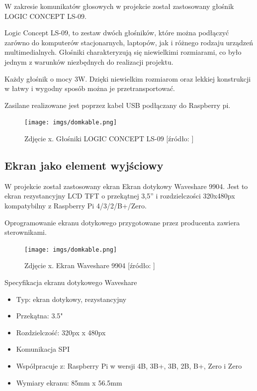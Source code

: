 \documentclass[a4paper,12pt,reqno]{article}
\begin{document}
W zakresie komunikatów głosowych w projekcie został zastosowany głośnik LOGIC CONCEPT LS-09.

Logic Concept LS-09, to zestaw dwóch głośników, które można podłączyć zarówno do komputerów stacjonarnych, laptopów, jak i różnego rodzaju urządzeń multimedialnych. Głośniki charakteryzują się niewielkimi rozmiarami, co było jednym z warunków niezbędnych do realizacji projektu.

Każdy głośnik o mocy 3W. Dzięki niewielkim rozmiarom oraz lekkiej konstrukcji w łatwy i wygodny sposób można je przetransportować.

Zasilane realizowane jest poprzez kabel USB podłączany do Raspberry pi.

\begin{figure}[!ht]%
\centering
\texttt{[image: imgs/domkable.png]}
\caption{Zdjęcie x. Głośniki LOGIC CONCEPT LS-09 [źródło: ] \label{glosnik}}
\quad
\end{figure}

\subsection{Ekran jako element wyjściowy}

W projekcie został zastosowany ekran Ekran dotykowy Waveshare 9904. Jest to ekran rezystancyjny LCD TFT o przekątnej 3,5'' i rozdzielczości 320x480px kompatybilny z Raspberry Pi 4/3/2/B+/Zero.

Oprogramowanie ekranu dotykowego przygotowane przez producenta zawiera sterownikami.

\begin{figure}[!ht]%
\centering
\texttt{[image: imgs/domkable.png]}
\caption{Zdjęcie x. Ekran Waveshare 9904 [źródło: ] \label{ekran}}
\quad
\end{figure}

Specyfikacja ekranu dotykowego Waveshare

\begin{itemize}
	\item Typ: ekran dotykowy, rezystancyjny
	\item Przekątna: 3.5"
	\item Rozdzielczość: 320px x 480px
	\item Komunikacja SPI
	\item Współpracuje z: Raspberry Pi w wersji 4B, 3B+, 3B, 2B, B+, Zero i Zero
	\item Wymiary ekranu: 85mm x 56.5mm
\end{itemize}
\end{document}
